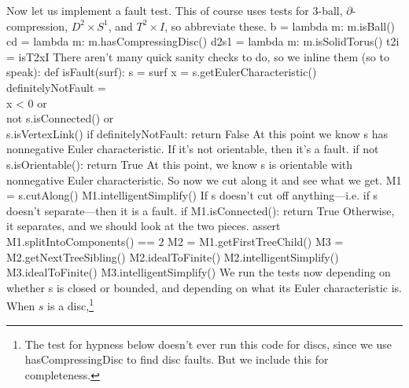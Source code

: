 \documentclass[10pt,twocolumn]{article}%
\theoremstyle{definition}
\begin{document}
\nwendcode{}\nwdocspar
Now let us implement a fault test.
This of course uses tests
for 3-ball, $\partial$-compression, $D^2 \times S^1$, 
and $T^2\times I$,
so abbreviate these.
\nwenddocs{}\endmoddef\nwstartdeflinemarkup\nwenddeflinemarkup
b = lambda m: m.isBall()
cd = lambda m: m.hasCompressingDisc()
d2s1 = lambda m: m.isSolidTorus()
t2i = isT2xI
\nwendcode{}\nwdocspar
There aren't many quick sanity checks
to do, so we inline them (so to speak):
\nwenddocs{}\endmoddef\nwstartdeflinemarkup\nwenddeflinemarkup
def isFault(surf):
  s = surf
  x = s.getEulerCharacteristic()
  definitelyNotFault =     \\
    x < 0 or               \\
    not s.isConnected() or \\
    s.isVertexLink()
  if definitelyNotFault:
    return False
\nwendcode{}\nwdocspar
At this point we know {\Tt{}s\nwendquote}
has nonnegative Euler characteristic.
If it's not orientable, then it's a fault.
\nwenddocs{}\plusendmoddef\nwstartdeflinemarkup\nwenddeflinemarkup
  if not s.isOrientable():
    return True
\nwendcode{}\nwdocspar
At this point, we know {\Tt{}s\nwendquote}
is orientable with nonnegative
Euler characteristic. So now
we cut along it and see what we get.
\nwenddocs{}\plusendmoddef\nwstartdeflinemarkup\nwenddeflinemarkup
  M1 = s.cutAlong()
  M1.intelligentSimplify()
\nwendcode{}\nwdocspar
If {\Tt{}s\nwendquote} doesn't cut off anything---i.e.
if {\Tt{}s\nwendquote} doesn't separate---then it is a fault.
\nwenddocs{}\plusendmoddef\nwstartdeflinemarkup\nwenddeflinemarkup
  if M1.isConnected():
    return True
\nwendcode{}\nwdocspar
Otherwise, it separates, and we should
look at the two pieces.
\nwenddocs{}\plusendmoddef\nwstartdeflinemarkup\nwenddeflinemarkup
  assert M1.splitIntoComponents() == 2
  M2 = M1.getFirstTreeChild()
  M3 = M2.getNextTreeSibling()
  M2.idealToFinite()
  M2.intelligentSimplify()
  M3.idealToFinite()
  M3.intelligentSimplify()
\nwendcode{}\nwdocspar
We run the tests now depending
on whether {\Tt{}s\nwendquote} is closed or bounded,
and depending on what its Euler
characteristic is.
\nwenddocs{}\nwdocspar
When $s$ is a disc,\footnote{The
test for hypness below doesn't ever
run this code for discs, since we use {\Tt{}hasCompressingDisc\nwendquote}
to find disc faults. But we include this
for completeness.}
\end{document}
